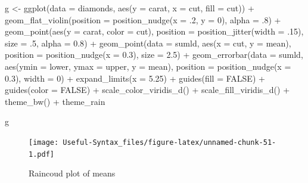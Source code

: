 \documentclass[
]{article}
\newenvironment{Shaded}{\begin{snugshade}}{\end{snugshade}}
\newcommand{\AttributeTok}[1]{\textcolor[rgb]{0.77,0.63,0.00}{#1}}
\newcommand{\ConstantTok}[1]{\textcolor[rgb]{0.00,0.00,0.00}{#1}}
\newcommand{\DecValTok}[1]{\textcolor[rgb]{0.00,0.00,0.81}{#1}}
\newcommand{\FloatTok}[1]{\textcolor[rgb]{0.00,0.00,0.81}{#1}}
\newcommand{\FunctionTok}[1]{\textcolor[rgb]{0.00,0.00,0.00}{#1}}
\newcommand{\NormalTok}[1]{#1}
\newcommand{\OtherTok}[1]{\textcolor[rgb]{0.56,0.35,0.01}{#1}}
\newcommand{\SpecialCharTok}[1]{\textcolor[rgb]{0.00,0.00,0.00}{#1}}
\begin{document}
\begin{Shaded}
\begin{Highlighting}[]
\NormalTok{g }\OtherTok{\textless{}{-}} \FunctionTok{ggplot}\NormalTok{(}\AttributeTok{data =}\NormalTok{ diamonds, }\FunctionTok{aes}\NormalTok{(}\AttributeTok{y =}\NormalTok{ carat, }\AttributeTok{x =}\NormalTok{ cut, }\AttributeTok{fill =}\NormalTok{ cut)) }\SpecialCharTok{+}
\FunctionTok{geom\_flat\_violin}\NormalTok{(}\AttributeTok{position =} \FunctionTok{position\_nudge}\NormalTok{(}\AttributeTok{x =}\NormalTok{ .}\DecValTok{2}\NormalTok{, }\AttributeTok{y =} \DecValTok{0}\NormalTok{), }\AttributeTok{alpha =}\NormalTok{ .}\DecValTok{8}\NormalTok{) }\SpecialCharTok{+}
\FunctionTok{geom\_point}\NormalTok{(}\FunctionTok{aes}\NormalTok{(}\AttributeTok{y =}\NormalTok{ carat, }\AttributeTok{color =}\NormalTok{ cut), }\AttributeTok{position =} \FunctionTok{position\_jitter}\NormalTok{(}\AttributeTok{width =}\NormalTok{ .}\DecValTok{15}\NormalTok{), }\AttributeTok{size =}\NormalTok{ .}\DecValTok{5}\NormalTok{, }\AttributeTok{alpha =} \FloatTok{0.8}\NormalTok{) }\SpecialCharTok{+}
\FunctionTok{geom\_point}\NormalTok{(}\AttributeTok{data =}\NormalTok{ sumld, }\FunctionTok{aes}\NormalTok{(}\AttributeTok{x =}\NormalTok{ cut, }\AttributeTok{y =}\NormalTok{ mean), }\AttributeTok{position =} \FunctionTok{position\_nudge}\NormalTok{(}\AttributeTok{x =} \FloatTok{0.3}\NormalTok{), }\AttributeTok{size =} \FloatTok{2.5}\NormalTok{) }\SpecialCharTok{+}
\FunctionTok{geom\_errorbar}\NormalTok{(}\AttributeTok{data =}\NormalTok{ sumld, }\FunctionTok{aes}\NormalTok{(}\AttributeTok{ymin =}\NormalTok{ lower, }\AttributeTok{ymax =}\NormalTok{ upper, }\AttributeTok{y =}\NormalTok{ mean), }\AttributeTok{position =} \FunctionTok{position\_nudge}\NormalTok{(}\AttributeTok{x =} \FloatTok{0.3}\NormalTok{), }\AttributeTok{width =} \DecValTok{0}\NormalTok{) }\SpecialCharTok{+}
\FunctionTok{expand\_limits}\NormalTok{(}\AttributeTok{x =} \FloatTok{5.25}\NormalTok{) }\SpecialCharTok{+}
\FunctionTok{guides}\NormalTok{(}\AttributeTok{fill =} \ConstantTok{FALSE}\NormalTok{) }\SpecialCharTok{+}
\FunctionTok{guides}\NormalTok{(}\AttributeTok{color =} \ConstantTok{FALSE}\NormalTok{) }\SpecialCharTok{+}
\FunctionTok{scale\_color\_viridis\_d}\NormalTok{() }\SpecialCharTok{+}
\FunctionTok{scale\_fill\_viridis\_d}\NormalTok{() }\SpecialCharTok{+}
\FunctionTok{theme\_bw}\NormalTok{() }\SpecialCharTok{+}
\NormalTok{theme\_rain}

\NormalTok{g}
\end{Highlighting}
\end{Shaded}

\begin{figure}
\centering
\texttt{[image: Useful-Syntax\_files/figure-latex/unnamed-chunk-51-1.pdf]}
\caption{\label{fig:unnamed-chunk-51}Raincoud plot of means}
\end{figure}
\end{document}
